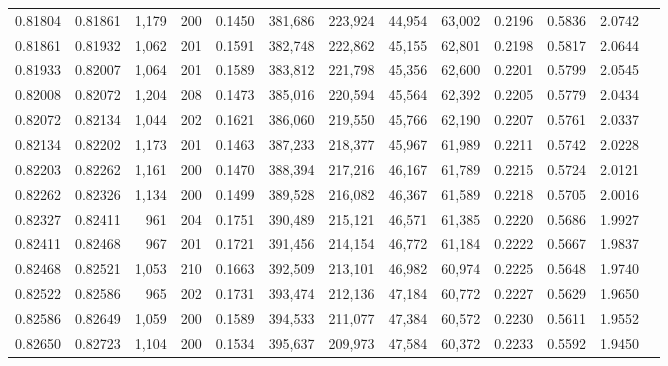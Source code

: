 \begin{tabular}{rrrrrrrrrrrrr}
0.81804 & 0.81861 & 1,179 & 200 &                                     0.1450 & 381,686 & 223,924 &  44,954 &  63,002 & 0.2196 & 0.5836 & 2.0742 \\
0.81861 & 0.81932 & 1,062 & 201 &                                     0.1591 & 382,748 & 222,862 &  45,155 &  62,801 & 0.2198 & 0.5817 & 2.0644 \\
0.81933 & 0.82007 & 1,064 & 201 &                                     0.1589 & 383,812 & 221,798 &  45,356 &  62,600 & 0.2201 & 0.5799 & 2.0545 \\
0.82008 & 0.82072 & 1,204 & 208 &                                     0.1473 & 385,016 & 220,594 &  45,564 &  62,392 & 0.2205 & 0.5779 & 2.0434 \\
0.82072 & 0.82134 & 1,044 & 202 &                                     0.1621 & 386,060 & 219,550 &  45,766 &  62,190 & 0.2207 & 0.5761 & 2.0337 \\
0.82134 & 0.82202 & 1,173 & 201 &                                     0.1463 & 387,233 & 218,377 &  45,967 &  61,989 & 0.2211 & 0.5742 & 2.0228 \\
0.82203 & 0.82262 & 1,161 & 200 &                                     0.1470 & 388,394 & 217,216 &  46,167 &  61,789 & 0.2215 & 0.5724 & 2.0121 \\
0.82262 & 0.82326 & 1,134 & 200 &                                     0.1499 & 389,528 & 216,082 &  46,367 &  61,589 & 0.2218 & 0.5705 & 2.0016 \\
0.82327 & 0.82411 &   961 & 204 &                                     0.1751 & 390,489 & 215,121 &  46,571 &  61,385 & 0.2220 & 0.5686 & 1.9927 \\
0.82411 & 0.82468 &   967 & 201 &                                     0.1721 & 391,456 & 214,154 &  46,772 &  61,184 & 0.2222 & 0.5667 & 1.9837 \\
0.82468 & 0.82521 & 1,053 & 210 &                                     0.1663 & 392,509 & 213,101 &  46,982 &  60,974 & 0.2225 & 0.5648 & 1.9740 \\
0.82522 & 0.82586 &   965 & 202 &                                     0.1731 & 393,474 & 212,136 &  47,184 &  60,772 & 0.2227 & 0.5629 & 1.9650 \\
0.82586 & 0.82649 & 1,059 & 200 &                                     0.1589 & 394,533 & 211,077 &  47,384 &  60,572 & 0.2230 & 0.5611 & 1.9552 \\
0.82650 & 0.82723 & 1,104 & 200 &                                     0.1534 & 395,637 & 209,973 &  47,584 &  60,372 & 0.2233 & 0.5592 & 1.9450 \\

\end{tabular}
